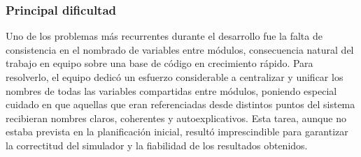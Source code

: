 \documentclass[11pt, a4paper]{article} %
\begin{document}
\subsubsection{Principal dificultad}
Uno de los problemas más recurrentes durante el desarrollo fue la falta de consistencia en el nombrado de variables entre módulos, consecuencia natural del trabajo en equipo sobre una base de código en crecimiento rápido. Para resolverlo, el equipo dedicó un esfuerzo considerable a centralizar y unificar los nombres de todas las variables compartidas entre módulos, poniendo especial cuidado en que aquellas que eran referenciadas desde distintos puntos del sistema recibieran nombres claros, coherentes y autoexplicativos. Esta tarea, aunque no estaba prevista en la planificación inicial, resultó imprescindible para garantizar la correctitud del simulador y la fiabilidad de los resultados obtenidos.
\end{document}
